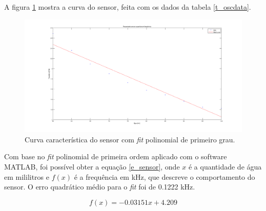 A figura \ref{f_oscdata} mostra a curva do sensor, feita com os dados da tabela \ref{t_oscdata}.

\begin{figure}[H]
    \centering
    \includegraphics[scale=0.3]{img/oscdata.png}
    \caption{Curva característica do sensor com \textit{fit} polinomial de primeiro grau.}
    \label{f_oscdata}
\end{figure}

Com base no \textit{fit} polinomial de primeira ordem aplicado com o software MATLAB, foi possível obter a equação \ref{e_sensor}, onde $x$ é a quantidade de água em mililitros e $f(x)$ é a frequência em kHz, que descreve o comportamento do sensor. O erro quadrático médio para o \textit{fit} foi de 0.1222 kHz.

\begin{equation}
f(x) = -0.03151x + 4.209
\label{e_sensor}
\end{equation}